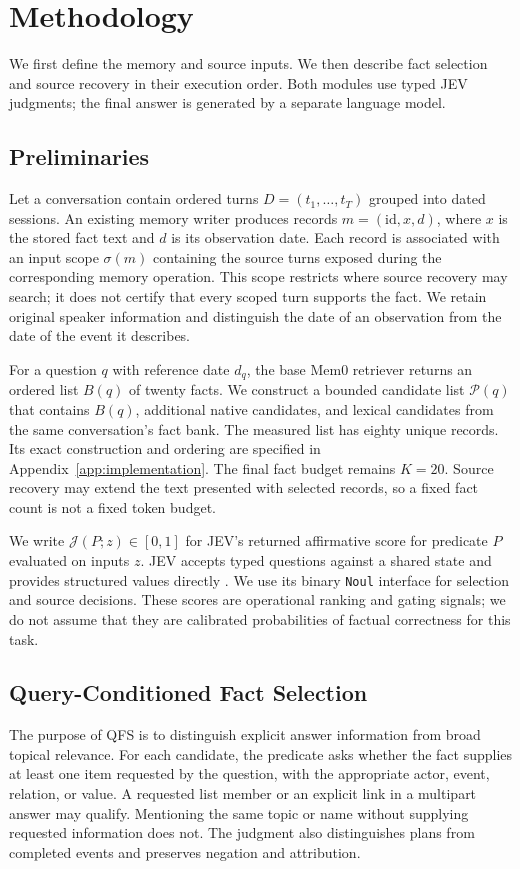 \documentclass[11pt]{article}
\newcommand{\qfs}{\textsc{QFS}}
\newcommand{\jev}{\mathcal{J}}
\begin{document}
\section{Methodology}
We first define the memory and source inputs. We then describe fact selection and source recovery in their execution order. Both modules use typed JEV judgments; the final answer is generated by a separate language model.

\subsection{Preliminaries}
Let a conversation contain ordered turns $D=(t_1,\ldots,t_T)$ grouped into dated sessions. An existing memory writer produces records $m=(\mathrm{id},x,d)$, where $x$ is the stored fact text and $d$ is its observation date. Each record is associated with an input scope $\sigma(m)$ containing the source turns exposed during the corresponding memory operation. This scope restricts where source recovery may search; it does not certify that every scoped turn supports the fact. We retain original speaker information and distinguish the date of an observation from the date of the event it describes.

For a question $q$ with reference date $d_q$, the base Mem0 retriever returns an ordered list $B(q)$ of twenty facts. We construct a bounded candidate list $\mathcal{P}(q)$ that contains $B(q)$, additional native candidates, and lexical candidates from the same conversation's fact bank. The measured list has eighty unique records. Its exact construction and ordering are specified in Appendix~\ref{app:implementation}. The final fact budget remains $K=20$. Source recovery may extend the text presented with selected records, so a fixed fact count is not a fixed token budget.

We write $\jev(P;z)\in[0,1]$ for JEV's returned affirmative score for predicate $P$ evaluated on inputs $z$. JEV accepts typed questions against a shared state and provides structured values directly \citep{typesafe2026jev}. We use its binary \texttt{Noul} interface for selection and source decisions. These scores are operational ranking and gating signals; we do not assume that they are calibrated probabilities of factual correctness for this task.

\subsection{Query-Conditioned Fact Selection}
\label{sec:qfs}
The purpose of \qfs{} is to distinguish explicit answer information from broad topical relevance. For each candidate, the predicate asks whether the fact supplies at least one item requested by the question, with the appropriate actor, event, relation, or value. A requested list member or an explicit link in a multipart answer may qualify. Mentioning the same topic or name without supplying requested information does not. The judgment also distinguishes plans from completed events and preserves negation and attribution.
\end{document}

